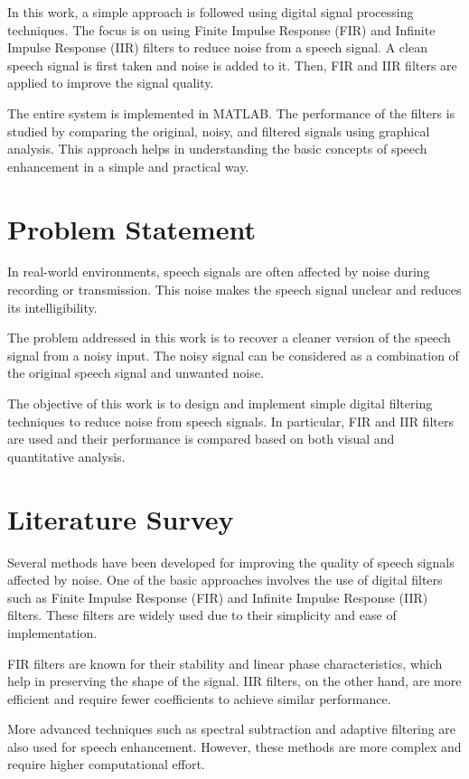 \documentclass[conference]{IEEEtran}
\begin{document}
In this work, a simple approach is followed using digital signal processing techniques. The focus is on using Finite Impulse Response (FIR) and Infinite Impulse Response (IIR) filters to reduce noise from a speech signal. A clean speech signal is first taken and noise is added to it. Then, FIR and IIR filters are applied to improve the signal quality.

The entire system is implemented in MATLAB. The performance of the filters is studied by comparing the original, noisy, and filtered signals using graphical analysis. This approach helps in understanding the basic concepts of speech enhancement in a simple and practical way.

\section{Problem Statement}

In real-world environments, speech signals are often affected by noise during recording or transmission. This noise makes the speech signal unclear and reduces its intelligibility.

The problem addressed in this work is to recover a cleaner version of the speech signal from a noisy input. The noisy signal can be considered as a combination of the original speech signal and unwanted noise.

The objective of this work is to design and implement simple digital filtering techniques to reduce noise from speech signals. In particular, FIR and IIR filters are used and their performance is compared based on both visual and quantitative analysis.

\section{Literature Survey}

Several methods have been developed for improving the quality of speech signals affected by noise. One of the basic approaches involves the use of digital filters such as Finite Impulse Response (FIR) and Infinite Impulse Response (IIR) filters. These filters are widely used due to their simplicity and ease of implementation.

FIR filters are known for their stability and linear phase characteristics, which help in preserving the shape of the signal. IIR filters, on the other hand, are more efficient and require fewer coefficients to achieve similar performance.

More advanced techniques such as spectral subtraction and adaptive filtering are also used for speech enhancement. However, these methods are more complex and require higher computational effort.
\end{document}
